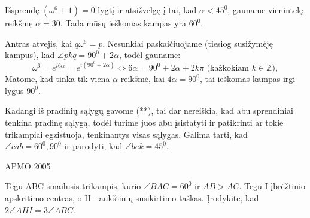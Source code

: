\begin{sprendimas}
Išsprendę $(\omega^6+1)=0$ lygtį ir atsižvelgę į tai, kad $ \alpha < 45^0$, gauname vienintelę reikšmę $\alpha = 30$. Tada mūsų ieškomas kampas yra $60^0$.

Antras atvejis, kai $q\omega^6 =p$. Nesunkiai paskaičiuojame (tiesiog susižymėję kampus), kad $\angle pkq=90^0 +2\alpha$, todėl gauname:
\begin{equation*}
\omega^6=e^{i6\alpha}=e^{i(90^0 +2\alpha)} \Leftrightarrow 6\alpha=90^0 +2\alpha +2k\pi \text{ (kažkokiam } k\in \mathbb{Z}),
\end{equation*}
Matome, kad tinka tik viena $\alpha$ reikšmė, kai $4\alpha=90^0$, tai ieškomas kampas irgi lygus $90^0$.

Kadangi iš pradinių sąlygų gavome (**), tai dar nereiškia, kad abu sprendiniai tenkina pradinę sąlygą, todėl turime juos abu įsistatyti ir patikrinti ar tokie trikampiai egzistuoja, tenkinantys visas sąlygas. Galima tarti, kad $\angle cab= 60^0,90^0$ ir parodyti, kad $\angle bek =45^0$.
\end{sprendimas}
\begin{pavnr}
 APMO 2005

Tegu ABC smailusis trikampis, kurio $\angle BAC = 60^0$ ir $AB>AC$. Tegu I įbrėžtinio apskritimo centras, o H - aukštinių susikirtimo taškas. Įrodykite, kad $2\angle AHI=3\angle ABC$.
\end{pavnr}
